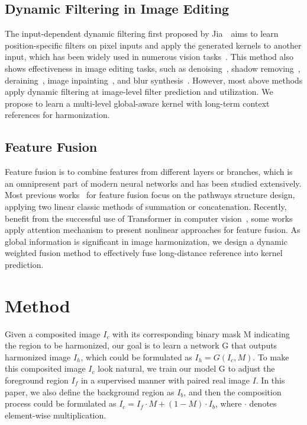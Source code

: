 \documentclass[10pt,twocolumn,letterpaper]{article}
\begin{document}
\subsection{Dynamic Filtering in Image Editing}
The input-dependent dynamic filtering first proposed by Jia~\cite{jia2016dynamic}~\etal aims to learn position-specific filters on pixel inputs and apply the generated kernels to another input, which has been widely used in numerous vision tasks~\cite{niklaus2017video,jo2018deep,yang2019condconv,dai2017deformable}. This method also shows effectiveness in image editing tasks, such as denoising~\cite{bako2017kernel,mildenhall2018burst,vogels2018denoising}, shadow removing~\cite{fu2021auto}, deraining~\cite{guo2021efficientderain}, image inpainting~\cite{li2022misf}, and blur synthesis~\cite{brooks2019learning}. However, most above methods apply dynamic filtering at image-level filter prediction and utilization. We propose to learn a multi-level global-aware kernel with long-term context references for harmonization.

\subsection{Feature Fusion} 
Feature fusion is to combine features from different layers or branches, which is an omnipresent part of modern neural networks and has been studied extensively. Most previous works~\cite{he2016deep,ronneberger2015u,lin2017feature} for feature fusion focus on the pathways structure design, applying two linear classic methods of summation or concatenation. Recently, benefit from the successful use of Transformer in computer vision~\cite{chen2020generative,dosovitskiy2020image,liu2021swin,zhang2021analogous,zhang2022eatformer,zhang2023rethinking,carion2020end,chen2020generative,esser2021taming,wan2021high,jiang2021transgan,liu2021fuseformer,Guo_2021_ICCV}, some works~\cite{hu2018squeeze,li2019selective,zhang2018exfuse,dai2021attentional,zhang2022resnest,zhang2022scsnet,chen2023better} apply attention mechanism to present nonlinear approaches for feature fusion. As global information is significant in image harmonization, we design a dynamic weighted fusion method to effectively fuse long-distance reference into kernel prediction.

\section{Method}

Given a composited image $I_c$ with its corresponding binary mask M indicating the region to be harmonized, our goal is to learn a network G that outputs harmonized image $I_h$, which could be formulated as $I_h=G(I_c, M)$. To make this composited image $I_c$ look natural, we train our model G to adjust the foreground region $I_f$ in a supervised manner with paired real image $I$. In this paper, we also define the background region as $I_b$, and then the composition process could be formulated as $I_c=I_f \cdot M + (1-M) \cdot I_b$, where $ \cdot $ denotes element-wise multiplication.
\end{document}

